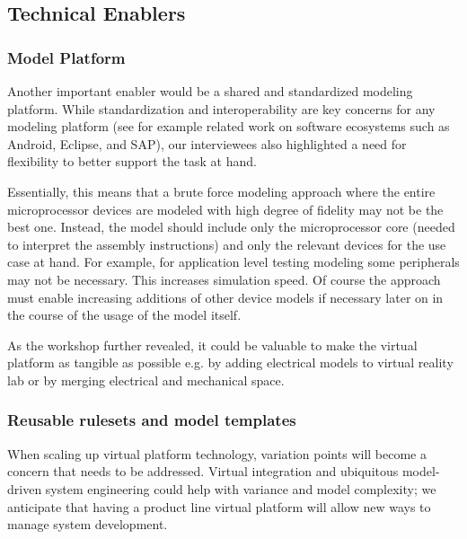 \subsection{Technical Enablers}
\subsubsection{Model Platform}
Another important enabler would be a shared and standardized modeling platform.
While standardization and interoperability are key concerns for any modeling platform (see for example related work on software ecosystems such as Android, Eclipse, and SAP), our interviewees also highlighted a need for flexibility to better support the task at hand.

Essentially, this means that a brute force modeling approach where the entire microprocessor devices are modeled with high degree of fidelity may not be the best one. Instead, the model should include only the microprocessor core (needed to interpret the assembly instructions) and only the relevant devices for the use case at hand. For example, for application level testing modeling some peripherals may not be necessary. This increases simulation speed. Of course the approach must enable increasing additions of other device models if necessary later on in the course of the usage of the model itself. 

As the workshop further revealed, it could be valuable to make the virtual platform as tangible as possible e.g. by adding electrical models to virtual reality lab or by merging electrical and mechanical space.

\subsubsection{Reusable rulesets and model templates}
When scaling up virtual platform technology, variation points will become a concern that needs to be addressed. Virtual integration and ubiquitous model-driven system engineering could help with variance and model complexity; we anticipate that having a product line virtual platform will allow new ways to manage system development.

